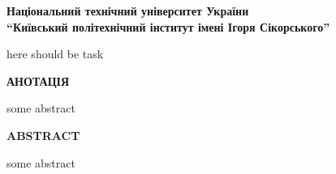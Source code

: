 \thispagestyle{empty}

\begin{center}
\textbf{Національний технічний  університет України \\
``Київський політехнічний інститут імені Ігоря Сікорського''}
\end{center}

here should be task


\newpage
\thispagestyle{empty}
\begin{center}
\textbf{\Large АНОТАЦІЯ}
\end{center}

some abstract

\newpage
\thispagestyle{empty}

\begin{center}
\textbf{\Large ABSTRACT}
\end{center}

some abstract